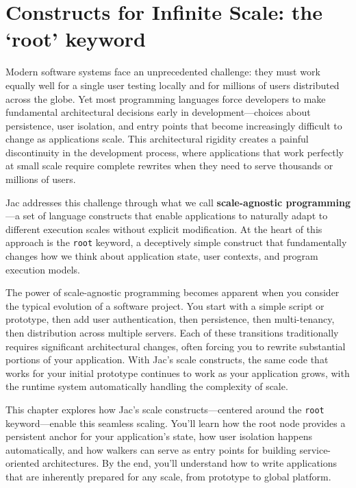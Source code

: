 \mtcaddchapter
\chapter{Constructs for Infinite Scale: the `root' keyword}
\minitoc

Modern software systems face an unprecedented challenge: they must work equally well for a single user testing locally and for millions of users distributed across the globe. Yet most programming languages force developers to make fundamental architectural decisions early in development—choices about persistence, user isolation, and entry points that become increasingly difficult to change as applications scale. This architectural rigidity creates a painful discontinuity in the development process, where applications that work perfectly at small scale require complete rewrites when they need to serve thousands or millions of users.

Jac addresses this challenge through what we call \textbf{scale-agnostic programming}—a set of language constructs that enable applications to naturally adapt to different execution scales without explicit modification. At the heart of this approach is the \texttt{root} keyword, a deceptively simple construct that fundamentally changes how we think about application state, user contexts, and program execution models.

The power of scale-agnostic programming becomes apparent when you consider the typical evolution of a software project. You start with a simple script or prototype, then add user authentication, then persistence, then multi-tenancy, then distribution across multiple servers. Each of these transitions traditionally requires significant architectural changes, often forcing you to rewrite substantial portions of your application. With Jac's scale constructs, the same code that works for your initial prototype continues to work as your application grows, with the runtime system automatically handling the complexity of scale.

This chapter explores how Jac's scale constructs—centered around the \texttt{root} keyword—enable this seamless scaling. You'll learn how the root node provides a persistent anchor for your application's state, how user isolation happens automatically, and how walkers can serve as entry points for building service-oriented architectures. By the end, you'll understand how to write applications that are inherently prepared for any scale, from prototype to global platform.

